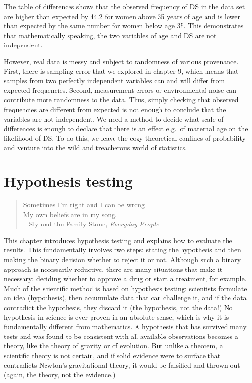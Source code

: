 \documentclass[
  letterpaper,
  DIV=11,
  numbers=noendperiod]{scrreprt}
\begin{document}
The table of differences shows that the observed frequency of DS in the
data set are higher than expected by 44.2 for women above 35 years of
age and is lower than expected by the same number for women below age
35. This demonstrates that mathematically speaking, the two variables of
age and DS are not independent.

However, real data is messy and subject to randomness of various
provenance. First, there is sampling error that we explored in chapter
9, which means that samples from two perfectly independent variables can
and will differ from expected frequencies. Second, measurement errors or
environmental noise can contribute more randomness to the data. Thus,
simply checking that observed frequencies are different from expected is
not enough to conclude that the variables are not independent. We need a
method to decide what scale of differences is enough to declare that
there is an effect e.g.~of maternal age on the likelihood of DS. To do
this, we leave the cozy theoretical confines of probability and venture
into the wild and treacherous world of statistics.


\hypertarget{hypothesis-testing}{%
\chapter{Hypothesis testing}\label{hypothesis-testing}}

\begin{quote}
Sometimes I'm right and I can be wrong\\
My own beliefs are in my song.\\
-- Sly and the Family Stone, \emph{Everyday People}
\end{quote}

This chapter introduces hypothesis testing and explains how to evaluate
the results. This fundamentally involves two steps: stating the
hypothesis and then making the binary decision whether to reject it or
not. Although such a binary approach is necessarily reductive, there are
many situations that make it necessary: deciding whether to approve a
drug or start a treatment, for example. Much of the scientific method is
based on hypothesis testing: scientists formulate an idea (hypothesis),
then accumulate data that can challenge it, and if the data contradict
the hypothesis, they discard it (the hypothesis, not the data!) No
hypothesis in science is ever proven in an absolute sense, which is why
it is fundamentally different from mathematics. A hypothesis that has
survived many tests and was found to be consistent with all available
observations becomes a theory, like the theory of gravity or of
evolution. But unlike a theorem, a scientific theory is not certain, and
if solid evidence were to surface that contradicts Newton's
gravitational theory, it would be falsified and thrown out (again, the
theory, not the evidence.)
\end{document}
